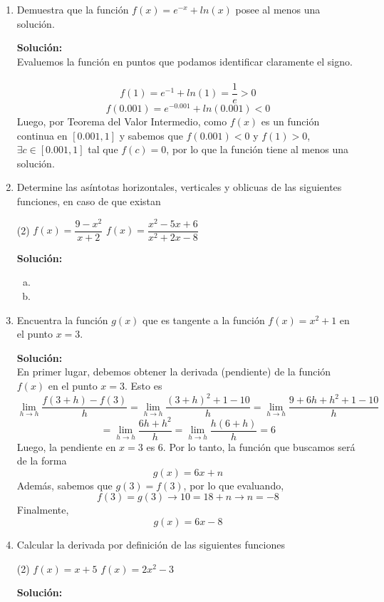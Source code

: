 \documentclass[12pt]{article}
\newenvironment{solucion}
{\begin{mdframed}[backgroundcolor=black!10]
		{\bf Solución:}\\
	}
	{
	\end{mdframed}
}
\newenvironment{preguntas}
{\begin{enumerate}\itemsep12pt
	}
	{
	\end{enumerate}
}
\newcommand{\ra}{\rightarrow}
\begin{document}
\begin{preguntas}
\item Demuestra que la función $f(x) = e^{-x} + ln(x)$ posee al menos una solución.
\begin{solucion}
Evaluemos la función en puntos que podamos identificar claramente el signo.\\
\\
$$f(1) = e^{-1} + ln(1) = \dfrac{1}{e} > 0$$
$$f(0.001) = e^{-0.001} + ln(0.001) < 0$$
Luego, por Teorema del Valor Intermedio, como $f(x)$ es un función continua en $[0.001, 1]$ y sabemos que $f(0.001) < 0$ y $f(1) > 0$, $\exists c \in [0.001, 1]$ tal que $f(c) = 0$, por lo que la función tiene al menos una solución.
\end{solucion}
\item Determine las asíntotas horizontales, verticales y oblicuas de las siguientes funciones, en caso de que existan
\begin{tasks}(2)
\task $f(x) = \dfrac{9-x^2}{x+2}$
\task $f(x) = \dfrac{x^2-5x+6}{x^2+2x-8}$
\end{tasks}
\begin{solucion}

\begin{enumerate}[a)]
\item 
\item 
\end{enumerate}
\end{solucion}
\item Encuentra la función $g(x)$ que es tangente a la función $f(x) = x^2 + 1$ en el punto $x = 3$.
\begin{solucion}
En primer lugar, debemos obtener la derivada (pendiente) de la función $f(x)$ en el punto $x=3$. Esto es
$$\lim\limits_{h\ra h} \dfrac{f(3+h) - f(3)}{h} =
\lim\limits_{h\ra h} \dfrac{(3+h)^2+1 - 10}{h} =
\lim\limits_{h\ra h} \dfrac{9+6h+h^2+1 - 10}{h}$$
$$=
\lim\limits_{h\ra h} \dfrac{6h+h^2}{h} =
\lim\limits_{h\ra h} \dfrac{h(6+h)}{h} = 
6
$$
Luego, la pendiente en $x=3$ es $6$. Por lo tanto, la función que buscamos será de la forma
$$g(x) = 6x + n$$
Además, sabemos que $g(3) = f(3)$, por lo que evaluando,
$$f(3) = g(3) \ra 10 = 18 + n \ra n = -8$$
Finalmente,
$$g(x) = 6x - 8$$
\end{solucion}
\item Calcular la derivada por definición de las siguientes funciones
\begin{tasks}(2)
\task $f(x) = x+5$
\task $f(x) = 2x^2-3$
\end{tasks}
\begin{solucion}


\end{solucion}
\end{preguntas}
\end{document}
